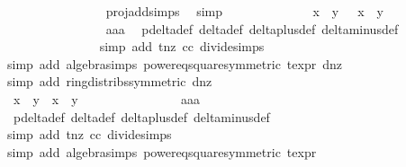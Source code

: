 \begin{isabellebody}
\ \ \ \ \ \ \ \ \ \ \ \ \ \ \isamarkupfalse%
\ proj{\isacharunderscore}add{\isachardot}simps\ \isamarkupfalse%
\ simp\isanewline
\ \ \ \ \ \ \ \ \ \ \ \ \isamarkupfalse%
\ {\isachardoublequoteopen}x{\isacharprime}\ {\isacharasterisk}\ y{\isacharprime}\ {\isasymnoteq}\ {\isacharminus}\ x\ {\isacharasterisk}\ y{\isachardoublequoteclose}\ \isanewline
\ \ \ \ \ \ \ \ \ \ \ \ \ \ \isamarkupfalse%
\ aaa\ \isamarkupfalse%
\ p{\isacharunderscore}delta{\isacharunderscore}def\ delta{\isacharunderscore}def\ delta{\isacharunderscore}plus{\isacharunderscore}def\ delta{\isacharunderscore}minus{\isacharunderscore}def\isanewline
\ \ \ \ \ \ \ \ \ \ \ \ \ \ \isamarkupfalse%
{\isacharparenleft}simp\ add{\isacharcolon}\ t{\isacharunderscore}nz\ cc\ divide{\isacharunderscore}simps{\isacharparenright}\isanewline
\ \ \ \ \ \ \ \ \ \ \ \ \ \ \isamarkupfalse%
{\isacharparenleft}simp\ add{\isacharcolon}\ algebra{\isacharunderscore}simps\ power{}{\isacharunderscore}eq{\isacharunderscore}square{\isacharbrackleft}symmetric{\isacharbrackright}\ t{\isacharunderscore}expr{\isacharparenleft}{}{\isacharparenright}\ d{\isacharunderscore}nz{\isacharparenright}\isanewline
\ \ \ \ \ \ \ \ \ \ \ \ \ \ \isamarkupfalse%
{\isacharparenleft}simp\ add{\isacharcolon}\ ring{\isacharunderscore}distribs{\isacharparenleft}{}{\isacharparenright}{\isacharbrackleft}symmetric{\isacharbrackright}\ d{\isacharunderscore}nz{\isacharparenright}\ \ \ \ \ \ \ \ \ \ \ \ \ \ \ \isanewline
\ \ \ \ \ \ \ \ \ \ \ \ \isamarkupfalse%
\ {\isachardoublequoteopen}x{\isacharprime}\ {\isacharasterisk}\ y{\isacharprime}\ {\isasymnoteq}\ x\ {\isacharasterisk}\ y{\isachardoublequoteclose}\isanewline
\ \ \ \ \ \ \ \ \ \ \ \ \ \ \isamarkupfalse%
\ aaa\ \isamarkupfalse%
\ p{\isacharunderscore}delta{\isacharunderscore}def\ delta{\isacharunderscore}def\ delta{\isacharunderscore}plus{\isacharunderscore}def\ delta{\isacharunderscore}minus{\isacharunderscore}def\isanewline
\ \ \ \ \ \ \ \ \ \ \ \ \ \ \isamarkupfalse%
{\isacharparenleft}simp\ add{\isacharcolon}\ t{\isacharunderscore}nz\ cc\ divide{\isacharunderscore}simps{\isacharparenright}\isanewline
\ \ \ \ \ \ \ \ \ \ \ \ \ \ \isamarkupfalse%
{\isacharparenleft}simp\ add{\isacharcolon}\ algebra{\isacharunderscore}simps\ power{}{\isacharunderscore}eq{\isacharunderscore}square{\isacharbrackleft}symmetric{\isacharbrackright}\ t{\isacharunderscore}expr{\isacharparenleft}{}{\isacharparenright}{\isacharparenright}\isanewline

\end{isabellebody}
